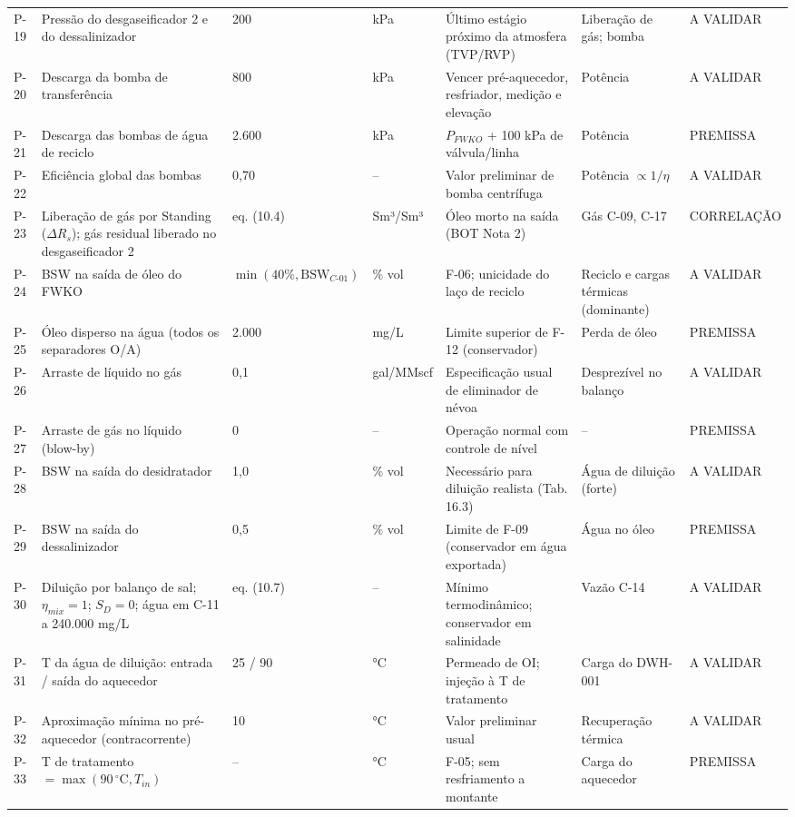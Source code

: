 \documentclass[11pt,a4paper]{article}
\numberwithin{equation}{section}
\numberwithin{table}{section}
\numberwithin{figure}{section}
\newcommand{\tipo}[1]{\textsf{\footnotesize #1}}
\newcommand{\AV}{\textcolor{red!70!black}{\tipo{A VALIDAR}}}
\begin{document}
\begin{landscape}
\begin{longtable}{lL{5.2cm}L{2.4cm}lL{5.4cm}L{4.0cm}l}
P-19 & Pressão do desgaseificador 2 e do dessalinizador & 200 & kPa & Último estágio próximo da atmosfera (TVP/RVP) & Liberação de gás; bomba & \AV\\
P-20 & Descarga da bomba de transferência & 800 & kPa & Vencer pré-aquecedor, resfriador, medição e elevação & Potência & \AV\\
P-21 & Descarga das bombas de água de reciclo & 2.600 & kPa & $P_{FWKO}$ + 100 kPa de válvula/linha & Potência & \tipo{PREMISSA}\\
P-22 & Eficiência global das bombas & 0{,}70 & -- & Valor preliminar de bomba centrífuga & Potência $\propto 1/\eta$ & \AV\\
P-23 & Liberação de gás por Standing ($\Delta R_s$); gás residual liberado no desgaseificador 2 & eq. (10.4) & Sm³/Sm³ & Óleo morto na saída (BOT Nota 2) & Gás C-09, C-17 & \tipo{CORRELAÇÃO}\\
P-24 & BSW na saída de óleo do FWKO & $\min(40\%,\mathrm{BSW}_{C\text{-}01})$ & \% vol & F-06; unicidade do laço de reciclo & Reciclo e cargas térmicas (dominante) & \AV\\
P-25 & Óleo disperso na água (todos os separadores O/A) & 2.000 & mg/L & Limite superior de F-12 (conservador) & Perda de óleo & \tipo{PREMISSA}\\
P-26 & Arraste de líquido no gás & 0,1 & gal/MMscf & Especificação usual de eliminador de névoa & Desprezível no balanço & \AV\\
P-27 & Arraste de gás no líquido (blow-by) & 0 & -- & Operação normal com controle de nível & -- & \tipo{PREMISSA}\\
P-28 & BSW na saída do desidratador & 1{,}0 & \% vol & Necessário para diluição realista (Tab. 16.3) & Água de diluição (forte) & \AV\\
P-29 & BSW na saída do dessalinizador & 0{,}5 & \% vol & Limite de F-09 (conservador em água exportada) & Água no óleo & \tipo{PREMISSA}\\
P-30 & Diluição por balanço de sal; $\eta_{mix}=1$; $S_D=0$; água em C-11 a 240.000 mg/L & eq. (10.7) & -- & Mínimo termodinâmico; conservador em salinidade & Vazão C-14 & \AV\\
P-31 & T da água de diluição: entrada / saída do aquecedor & 25 / 90 & °C & Permeado de OI; injeção à T de tratamento & Carga do DWH-001 & \AV\\
P-32 & Aproximação mínima no pré-aquecedor (contracorrente) & 10 & °C & Valor preliminar usual & Recuperação térmica & \AV\\
P-33 & T de tratamento $=\max(90\,^\circ\mathrm{C},T_{in})$ & -- & °C & F-05; sem resfriamento a montante & Carga do aquecedor & \tipo{PREMISSA}\\

\end{longtable}
\end{landscape}
\end{document}
